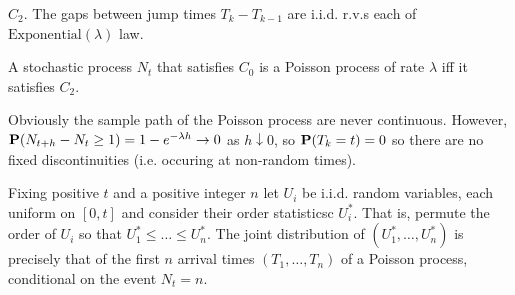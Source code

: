 \begin{condition*}
$\boxed{C_2}$. The gaps between jump times $T_k-T_{k-1}$ are i.i.d. r.v.s each of $\text{Exponential}(\lambda)$ law.
\end{condition*}

\begin{proposition*}
A stochastic process $N_t$ that satisfies $\boxed{C_0}$ is a Poisson process of rate $\lambda$ iff it satisfies $\boxed{C_2}$.
\end{proposition*}

\begin{remark*}
Obviously the sample path of the Poisson process are never continuous. However, $\mathbf{P}(N_{t+h} - N_t \geq 1) = 1-e^{-\lambda h} \to 0$ as $h \downarrow 0$, so $\mathbf{P}(T_k=t)=0$ so there are no fixed discontinuities (i.e. occuring at non-random times).
\end{remark*}

\begin{proposition*}
Fixing positive $t$ and a positive integer $n$ let $U_i$ be i.i.d. random variables, each uniform on $[0,t]$ and consider their order statisticsc $U_i^*$. That is, permute the order of $U_i$ so that $U_1^*\leq\dots\leq U_n^*$. The joint distribution of $(U_1^*,\dots,U_n^*)$ is precisely that of the first $n$ arrival times $(T_1,\dots,T_n)$ of a Poisson process, conditional on the event $N_t=n$.
\end{proposition*}

